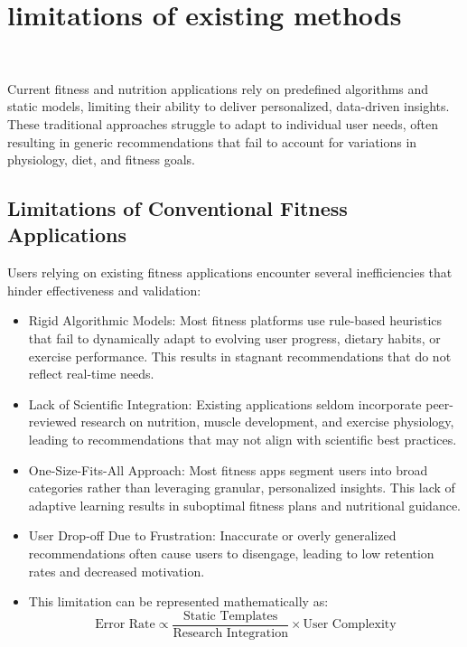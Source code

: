 \documentclass[conference]{IEEEtran}
\begin{document}
\section{limitations of existing methods}\

Current fitness and nutrition applications rely on predefined algorithms and static models, limiting their ability to deliver personalized, data-driven insights. These traditional approaches struggle to adapt to individual user needs, often resulting in generic recommendations that fail to account for variations in physiology, diet, and fitness goals.

\subsection{Limitations of Conventional Fitness Applications}

Users relying on existing fitness applications encounter several inefficiencies that hinder effectiveness and validation:\\

\begin{itemize}
	\item Rigid Algorithmic Models: Most fitness platforms use rule-based heuristics that fail to dynamically adapt to evolving user progress, dietary habits, or exercise performance. This results in stagnant recommendations that do not reflect real-time needs.
	\item Lack of Scientific Integration: Existing applications seldom incorporate peer-reviewed research on nutrition, muscle development, and exercise physiology, leading to recommendations that may not align with scientific best practices.
	\item One-Size-Fits-All Approach: Most fitness apps segment users into broad categories rather than leveraging granular, personalized insights. This lack of adaptive learning results in suboptimal fitness plans and nutritional guidance.
	\item User Drop-off Due to Frustration: Inaccurate or overly generalized recommendations often cause users to disengage, leading to low retention rates and decreased motivation.
        \item This limitation can be represented mathematically as:
            \begin{equation}
            \text{Error Rate} \propto \frac{\text{Static Templates}}{\text{Research Integration}} \times \text{User Complexity}
\end{equation}
\end{itemize}
\end{document}

